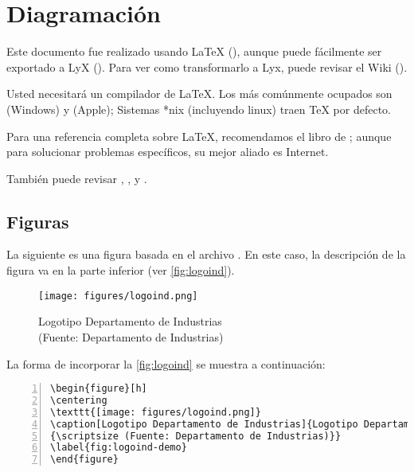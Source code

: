 \section{Diagramación}
Este documento fue realizado usando \LaTeX{} (\citet{latex:whatis}), aunque puede fácilmente ser exportado a LyX (\citeauthor{lyx}). Para ver como transformarlo a Lyx, puede revisar el Wiki (\citeauthor{wikilyx}).

Usted necesitará un compilador de \LaTeX. Los más comúnmente ocupados son \citeauthor{miktex} (Windows) y \citeauthor{mactex} (Apple); Sistemas *nix (incluyendo linux) traen \TeX{} por defecto.

Para una referencia completa sobre \LaTeX{}, recomendamos el libro de \cite{Lamport94}; aunque para solucionar problemas específicos, su mejor aliado es Internet.

También puede revisar \citet{Roberts05}, \citet{Oetiker06}, y \citet{Mittelbach04}.

\subsection{Figuras}
La siguiente es una figura basada en el archivo . En este caso, la descripción de la figura va en la parte inferior (ver \autoref{fig:logoind}).

\begin{figure}[ht!]
\centering
\texttt{[image: figures/logoind.png]}
\caption[Logotipo Departamento de Industrias]{Logotipo Departamento de Industrias\\
{\scriptsize (Fuente: Departamento de Industrias)}}
\label{fig:logoind}
\end{figure}

La forma de incorporar la \autoref{fig:logoind} se muestra a continuación:


\begin{Verbatim}[frame=lines, label=Incorporar \autoref{fig:logoind}
				, fontsize=\footnotesize, numbers=left
				, baselinestretch=1
				, formatcom=\color{gray}]
\begin{figure}[h]
\centering
\texttt{[image: figures/logoind.png]}
\caption[Logotipo Departamento de Industrias]{Logotipo Departamento de Industrias\\
{\scriptsize (Fuente: Departamento de Industrias)}}
\label{fig:logoind-demo}
\end{figure}
\end{Verbatim}

